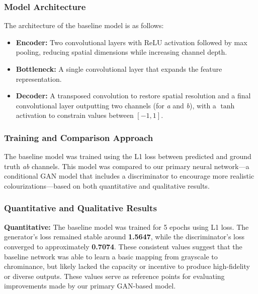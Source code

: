 \documentclass{article} %
\begin{document}
\subsubsection{Model Architecture}

The architecture of the baseline model is as follows:
\begin{itemize}
    \item \textbf{Encoder:} Two convolutional layers with ReLU activation followed by max pooling, reducing spatial dimensions while increasing channel depth.
    \item \textbf{Bottleneck:} A single convolutional layer that expands the feature representation.
    \item \textbf{Decoder:} A transposed convolution to restore spatial resolution and a final convolutional layer outputting two channels (for \textit{a} and \textit{b}), with a $\tanh$ 
    activation to constrain values between $[-1, 1]$.
\end{itemize}

\subsubsection{Training and Comparison Approach}

The baseline model was trained using the L1 loss between predicted and ground truth \textit{ab} channels. This model was compared to our primary neural network—a conditional 
GAN model that includes a discriminator to encourage more realistic colourizations—based on both quantitative and qualitative results.

\subsubsection{Quantitative and Qualitative Results}

\textbf{Quantitative:} The baseline model was trained for 5 epochs using L1 loss. The generator's loss remained stable around \textbf{1.5647}, while the discriminator's loss 
converged to approximately \textbf{0.7074}. These consistent values suggest that the baseline network was able to learn a basic mapping from grayscale to chrominance, but likely 
lacked the capacity or incentive to produce high-fidelity or diverse outputs. These values serve as reference points for evaluating improvements made by our primary GAN-based model.
\end{document}
